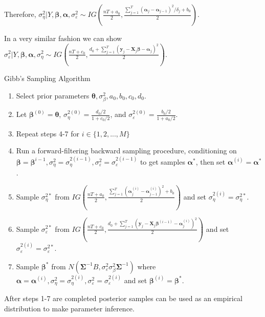 \documentclass[
]{article}
\begin{document}
Therefore, \(\sigma^2_\eta|Y, \boldsymbol{\beta}, \boldsymbol{\alpha}, \sigma^2_\varepsilon \sim IG(\frac{nT+a_0}{2}, \frac{\sum^T_{j=1} (\boldsymbol{\alpha}_j-\boldsymbol{\alpha}_{j-1})^2/\delta_j+b_0}{2})\).

In a very similar fashion we can show \(\sigma^2_\varepsilon|Y, \boldsymbol{\beta}, \boldsymbol{\alpha}, \sigma^2_\eta \sim IG(\frac{nT+c_0}{2}, \frac{d_0 + \sum^T_{j=1}(\boldsymbol{y}_j-\boldsymbol{X}_j\boldsymbol{\beta}-\boldsymbol{\alpha}_j)^2}{2})\).

\begin{algorithm}
\caption{Gibb's Sampling Algorithm}\label{alg:gibbs}
\begin{enumerate}
\item Select prior parameters $\boldsymbol{\theta}, \sigma^2_\beta, a_0, b_0, c_0, d_0$.
\item Let $\boldsymbol{\beta}^{(0)} = \boldsymbol{\theta}$, $\sigma^{2(0)}_\eta = \frac{d_0/2}{1+c_0/2}$, and $\sigma^{2(0)}_\varepsilon = \frac{b_0/2}{1+a_0/2}$.
\item Repeat steps 4-7 for $i\in\{1, 2, ..., M\}$
  \item Run a forward-filtering backward sampling procedure, conditioning on $\boldsymbol{\beta} = \boldsymbol{\beta}^{i-1}, \sigma^{2}_\eta = \sigma^{2(i-1)}_\eta, \sigma^{2}_\varepsilon =\sigma^{2(i-1)}_\varepsilon$ to get samples $\boldsymbol{\alpha}^*$, then set $\boldsymbol{\alpha}^{(i)} = \boldsymbol{\alpha}^*$.
  \item Sample $\sigma^{2*}_\eta$ from $IG(\frac{nT+a_0}{2}, \frac{\sum^T_{j=1} (\boldsymbol{\alpha}^{(i)}_j-\boldsymbol{\alpha}^{(i)}_{j-1})^2+b_0}{2})$ and set $\sigma^{2(i)}_\eta = \sigma^{2*}_\eta$.
  \item Sample $\sigma^{2*}_\varepsilon$ from $IG(\frac{nT+c_0}{2}, \frac{d_0 + \sum^T_{j=1}(\boldsymbol{y}_j-\boldsymbol{X}_j\boldsymbol{\beta}^{(i-1)}-\boldsymbol{\alpha}_j^{(i)})^2}{2})$ and set $\sigma^{2(i)}_\varepsilon = \sigma^{2*}_\varepsilon$.
  \item Sample $\boldsymbol{\beta}^*$ from $N(\boldsymbol{\Sigma}^{-1}B, \sigma^2_\varepsilon\sigma^2_\beta\boldsymbol{\Sigma}^{-1})$ where $\boldsymbol{\alpha} = \boldsymbol{\alpha}^{(i)}, \sigma^{2}_\eta = \sigma^{2(i)}_\eta, \sigma^{2}_\varepsilon=\sigma^{2(i)}_\varepsilon$ and set $\boldsymbol{\beta}^{(i)} = \boldsymbol{\beta}^*$.
\end{enumerate}
After steps 1-7 are completed posterior samples can be used as an empirical distribution to make parameter inference.
\end{algorithm}
\end{document}

